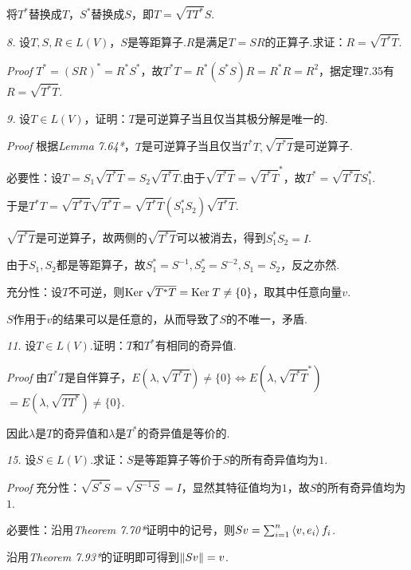 将\(T^*\)替换成\(T\)，\(S^*\)替换成\(S\)，即\(T=\sqrt{TT^*}S\).

\hspace*{\fill}

\textit{8.}
设\(T,S,R \in L(V)\)，\(S\)是等距算子.\(R\)是满足\(T=SR\)的正算子.求证：\(R=\sqrt{T^*T}\).

\textit{Proof}
\(T^*=(SR)^*=R^*S^*\)，故\(T^*T=R^*(S^*S)R=R^*R=R^2\)，据定理7.35有\(R=\sqrt{T^*T}\).

\hspace*{\fill}

\textit{9.}
设\(T \in L(V)\)，证明：\(T\)是可逆算子当且仅当其极分解是唯一的.

\textit{Proof}
根据\textit{Lemma 7.64*}，\(T\)是可逆算子当且仅当\(T^*T,\sqrt{T^*T}\)是可逆算子.

必要性：设\(T=S_1\sqrt{T^*T}=S_2\sqrt{T^*T}\).由于\(\sqrt{T^*T}=\sqrt{T^*T}^*\)，故\(T^*=\sqrt{T^*T}S_1^*\).

于是\(T^*T=\sqrt{T^*T}\sqrt{T^*T}=\sqrt{T^*T}(S_1^*S_2)\sqrt{T^*T}\).

\(\sqrt{T^*T}\)是可逆算子，故两侧的\(\sqrt{T^*T}\)可以被消去，得到\(S_1^*S_2=I\).

由于\(S_1,S_2\)都是等距算子，故\(S_1^*=S^{-1},S_2^*=S^{-2},S_1=S_2\)，反之亦然.

充分性：设\(T\)不可逆，则\(\mathrm{Ker \;} \sqrt{T^*T}=\mathrm{Ker \;} T \ne \{0\}\)，取其中任意向量\(v\).

\(S\)作用于\(v\)的结果可以是任意的，从而导致了\(S\)的不唯一，矛盾.

\hspace*{\fill}

\textit{11.}
设\(T \in L(V)\).证明：\(T\)和\(T^*\)有相同的奇异值.

\textit{Proof}
由\(T^*T\)是自伴算子，\(E(\lambda,\sqrt{T^*T}) \ne \{0\} \Leftrightarrow E(\lambda,\sqrt{T^*T}^*)\)
\(=E(\lambda,\sqrt{TT^*}) \ne \{0\}\).

因此\(\lambda\)是\(T\)的奇异值和\(\lambda\)是\(T^*\)的奇异值是等价的.

\hspace*{\fill}

\textit{15.}
设\(S \in L(V)\).求证：\(S\)是等距算子等价于\(S\)的所有奇异值均为\(1\).

\textit{Proof}
充分性：\(\sqrt{S^*S}=\sqrt{S^{-1}S}=I\)，显然其特征值均为\(1\)，故\(S\)的所有奇异值均为\(1\).

必要性：沿用\textit{Theorem 7.70*}证明中的记号，则\(Sv=\sum_{i=1}^n \left\langle v,e_i \right\rangle f_i\).

沿用\textit{Theorem 7.93*}的证明即可得到\(\left\lVert Sv \right\rVert=v\).

